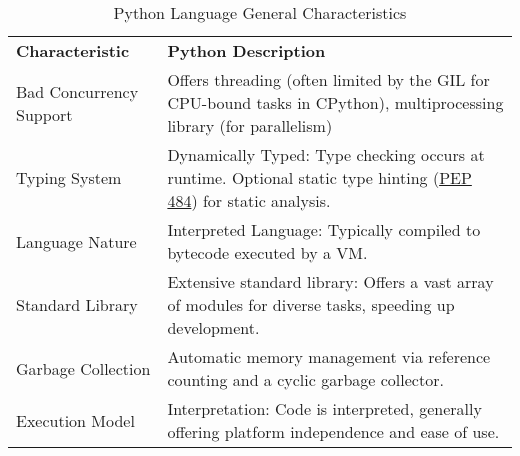 \begin{table}[h]
	\centering
	\caption{Python Language General Characteristics}
	\label{tab:python_characteristics}
	\begin{tabular}{
		>{\raggedright\arraybackslash}p{} %
		>{\raggedright\arraybackslash}p{}  %
	}
		\toprule
		\multicolumn{2}{c}{\textbf{General Characteristics}} \\
		\midrule
		\textbf{Characteristic}      & \textbf{Python Description}\\
		\midrule
		Bad Concurrency Support      & Offers threading (often limited by the \gls{GIL} for CPU-bound tasks in \gls{CPython}), multiprocessing library (for parallelism) \\
		\addlinespace
		Typing System                & Dynamically Typed: Type checking occurs at runtime. Optional static type hinting (\href{https://peps.python.org/pep-0484/}{PEP 484}) for static analysis. \\
		\addlinespace
		Language Nature              & Interpreted Language: Typically compiled to bytecode executed by a \gls{VM}. \\
		\addlinespace
		Standard Library             & Extensive standard library: Offers a vast array of modules for diverse tasks, speeding up development. \\
		\addlinespace
		Garbage Collection           & Automatic memory management via reference counting and a cyclic garbage collector. \\
		\addlinespace
		Execution Model              & Interpretation: Code is interpreted, generally offering platform independence and ease of use. \\
		\midrule
	\end{tabular}
\end{table}

